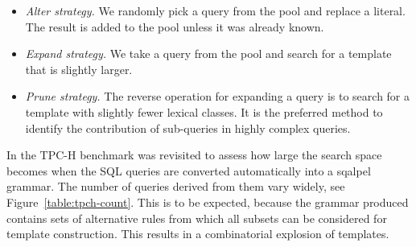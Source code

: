 \documentclass{cidr-2019}
\begin{document}
\begin{itemize}
\item{\emph{Alter strategy.\label{strategies}}}
We randomly pick a query from the pool and replace a literal. The
result is added to the pool unless it was already known.


\item{\emph{Expand strategy.}}  We take a query from the pool and
  search for a template that is slightly larger.

\item{\emph{Prune strategy.}}  The reverse operation for expanding a
  query is to search for a template with slightly fewer lexical
  classes.
It is the preferred method to identify the contribution of sub-queries
in highly complex queries.
\end{itemize}


In \cite{DBLP:conf/sigmod/KerstenKZ18} the TPC-H benchmark was
revisited to assess how large the search space becomes when the SQL
queries are converted automatically into a {\sc sqalpel} grammar. The
number of queries derived from them vary widely, see
Figure~\ref{table:tpch-count}.
This is to be expected, because the grammar produced contains sets of
alternative rules from which all subsets can be considered for template
construction. This results in a combinatorial explosion of templates.
\end{document}
